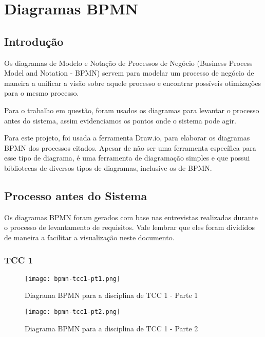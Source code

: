 \chapter{Diagramas BPMN}\label{chap:bpmn-appendix}

\section{Introdução}

Os diagramas de Modelo e Notação de Processos de Negócio (Business Process Model and Notation - BPMN) servem para modelar um processo de negócio de maneira a unificar a visão sobre aquele processo e encontrar possíveis otimizações para o mesmo processo.

Para o trabalho em questão, foram usados os diagramas para levantar o processo antes do sistema, assim evidenciamos os pontos onde o sistema pode agir.

Para este projeto, foi usada a ferramenta Draw.io\cite{drawio}, para elaborar os diagramas BPMN dos processos citados. Apesar de não ser uma ferramenta específica para esse tipo de diagrama, é uma ferramenta de diagramação simples e que possui bibliotecas de diversos tipos de diagramas, inclusive os de BPMN.

\section{Processo antes do Sistema}

Os diagramas BPMN foram gerados com base nas entrevistas realizadas durante o processo de levantamento de requisitos. Vale lembrar que eles foram divididos de maneira a facilitar a visualização neste documento.

\subsection{TCC 1}
\begin{figure}[H]
    \centering
    \texttt{[image: bpmn-tcc1-pt1.png]}
    \caption{Diagrama BPMN para a disciplina de TCC 1 - Parte 1}
    \label{fig:bpmn-tcc1-pt1}
\end{figure}

\begin{figure}[H]
    \centering
    \texttt{[image: bpmn-tcc1-pt2.png]}
    \caption{Diagrama BPMN para a disciplina de TCC 1 - Parte 2}
    \label{fig:bpmn-tcc1-pt2}
\end{figure}


